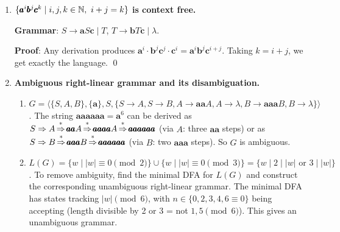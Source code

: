 \begin{enumerate}[{9.}1. ]
\begin{enumerate}
\item \textbf{Fix}: First transform $G_1$ and $G_2$ so that $\lambda$ is not derivable from their respective start symbols (or handle it explicitly). If $\lambda \in L(G_i)$, add explicit productions:
\[
Z \to S_1 S_2 \mid S_1 \mid S_2 \mid \lambda \quad \text{(appropriate subset based on whether } \lambda \in L(G_i)\text{)}
\]
Specifically: add $Z \to S_2$ if $\lambda \in L(G_1)$; add $Z \to S_1$ if $\lambda \in L(G_2)$; add $Z \to \lambda$ if $\lambda \in L(G_1) \cap L(G_2)$.

\item \textbf{Proof}: $w \in L(G^*_{\text{corrected}})$ iff $Z \DRightarrow w$ iff $w = uv$ with $u \in L(G_1)$ and $v \in L(G_2)$ (considering the $\lambda$ cases via the added productions) iff $w \in L(G_1)\cdot L(G_2)$. \qed
\end{enumerate}

\item \textbf{$\{\pmb{a}^i\pmb{b}^j\pmb{c}^k \mid i,j,k \in \mathbb{N},\ i+j=k\}$ is context free.}

\textbf{Grammar}: $S \to \pmb{a}S\pmb{c} \mid T$, $T \to \pmb{b}T\pmb{c} \mid \lambda$.

\textbf{Proof}: Any derivation produces $\pmb{a}^i \cdot \pmb{b}^j\pmb{c}^j \cdot \pmb{c}^i = \pmb{a}^i\pmb{b}^j\pmb{c}^{i+j}$. Taking $k = i+j$, we get exactly the language. \qed

\item \textbf{Ambiguous right-linear grammar and its disambiguation.}

\begin{enumerate}
\item $G = \langle\{S,A,B\},\{\pmb{a}\},S,\{S\to A, S\to B, A\to\pmb{aa}A, A\to\lambda, B\to\pmb{aaa}B, B\to\lambda\}\rangle$.
The string $\pmb{aaaaaa} = \pmb{a}^6$ can be derived as $S\Rightarrow A \operatorname{\overset{*}{\Rightarrow}} \pmb{aa}A\operatorname{\overset{*}{\Rightarrow}} \pmb{aaaa}A\operatorname{\overset{*}{\Rightarrow}} \pmb{aaaaaa}$ (via $A$: three $\pmb{aa}$ steps) or as $S \Rightarrow B \operatorname{\overset{*}{\Rightarrow}} \pmb{aaa}B\operatorname{\overset{*}{\Rightarrow}}\pmb{aaaaaa}$ (via $B$: two $\pmb{aaa}$ steps). So $G$ is ambiguous.

\item $L(G) = \{w \mid |w| \equiv 0 \pmod{2}\} \cup \{w \mid |w| \equiv 0 \pmod{3}\} = \{w \mid 2 \mid |w| \text{ or } 3 \mid |w|\}$.
To remove ambiguity, find the minimal DFA for $L(G)$ and construct the corresponding unambiguous right-linear grammar. The minimal DFA has states tracking $|w| \pmod{6}$, with $n \in \{0,2,3,4,6\equiv 0\}$ being accepting (length divisible by 2 or 3 = not $1,5 \pmod{6}$). This gives an unambiguous grammar.
\end{enumerate}


\end{enumerate}
